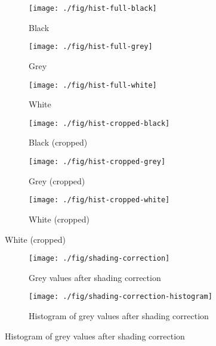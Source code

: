 \documentclass[10pt,fleqn]{article}
\begin{document}
\begin{figure}[!ht] %
\caption{Histograms of pixelwise mean values, with thresholds}

\centering

\begin{subfigure}[t]{0.32\textwidth}
\caption{Black}
\texttt{[image: ./fig/hist-full-black]}
\end{subfigure}
%
\begin{subfigure}[t]{0.32\textwidth}
\caption{Grey}
\texttt{[image: ./fig/hist-full-grey]}
\end{subfigure}
%
\begin{subfigure}[t]{0.32\textwidth}
\caption{White}
\texttt{[image: ./fig/hist-full-white]}
\end{subfigure}

\vspace*{10pt}

\begin{subfigure}[t]{0.32\textwidth}
\caption{Black (cropped)}
\texttt{[image: ./fig/hist-cropped-black]}
\end{subfigure}
%
\begin{subfigure}[t]{0.32\textwidth}
\caption{Grey (cropped)}
\texttt{[image: ./fig/hist-cropped-grey]}
\end{subfigure}
%
\begin{subfigure}[t]{0.32\textwidth}
\caption{White (cropped)}
\texttt{[image: ./fig/hist-cropped-white]}
\end{subfigure}

\end{figure}
\begin{figure}[!ht] %
\caption{Shading correction: $60000 \times (G-B) / (W - B)$}

\centering

\begin{subfigure}[t]{0.32\textwidth}
\caption{Grey values after shading correction}
\texttt{[image: ./fig/shading-correction]}
\end{subfigure}
%
\begin{subfigure}[t]{0.32\textwidth}
\caption{Histogram of grey values after shading correction}
\texttt{[image: ./fig/shading-correction-histogram]}
\end{subfigure}

\end{figure}
\end{document}
